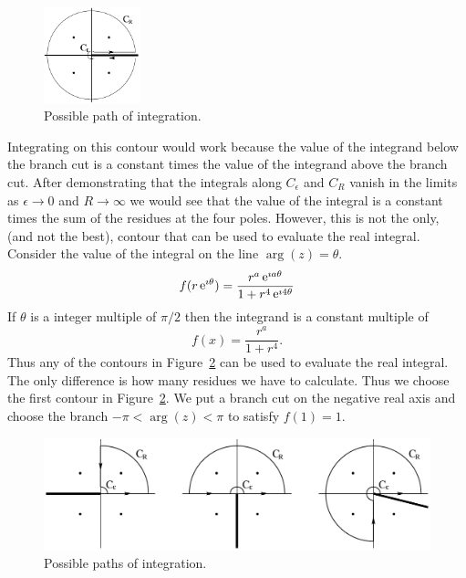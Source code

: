 {\begin{Solution}
  \begin{figure}[tb!]
    \begin{center}
      \includegraphics[width=0.25\textwidth]{fcv/residue/contepsrfourdot}
    \end{center}
    \caption{Possible path of integration.}
    \label{contepsrfourdot}
  \end{figure}

  Integrating on this contour would work because the value of the integrand
  below the branch cut is a constant times the value of the integrand above
  the branch cut.  After demonstrating that the integrals along $C_\epsilon$
  and $C_R$ vanish in the limits as $\epsilon \to 0$ and $R \to \infty$ we would
  see that the value of the integral is a constant times the sum of the residues
  at the four poles.  However, this is not the only, (and not the best), contour
  that can be used to evaluate the real integral.  Consider the value of
  the integral on the line $\arg(z) = \theta$.
  \[
  f( r \mathop{\mathrm{e}}\nolimits^{\imath \theta} ) = \frac{ r^a \mathop{\mathrm{e}}\nolimits^{\imath a \theta} }{ 1 + r^4 \mathop{\mathrm{e}}\nolimits^{\imath 4 \theta} }
  \]
  If $\theta$ is a integer multiple of $\pi/2$ then the integrand is a
  constant multiple of
  \[
  f(x) = \frac{ r^a }{ 1 + r^4 }.
  \]
  Thus any of the contours in Figure~\ref{threechoice} can be used to
  evaluate the real integral.  The only difference is how many residues
  we have to calculate.  Thus we choose the first contour in
  Figure~\ref{threechoice}.
  We put a branch cut on the negative real axis
  and choose the branch $-\pi < \arg(z) < \pi$ to satisfy $f(1) = 1$.

  \begin{figure}[tb!]
    \begin{center}
      \includegraphics[width=\textwidth]{fcv/residue/threechoice}
    \end{center}
    \caption{Possible paths of integration.}
    \label{threechoice}
  \end{figure}


\end{Solution}}
